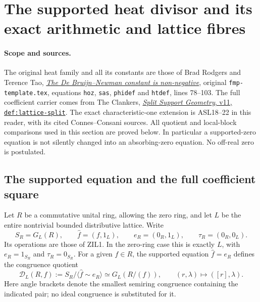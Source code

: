 \section{The supported heat divisor and its exact arithmetic and lattice fibres}
\label{sec:full-lattice-heat-divisor}

\paragraph{Scope and sources.}
The original heat family and all its constants are those of Brad Rodgers
and Terence Tao, \href{https://arxiv.org/abs/1801.05914v5}{\emph{The
De Bruijn--Newman constant is non-negative}}, original
\nolinkurl{fmp-template.tex}, equations \texttt{hoz}, \texttt{sas},
\texttt{phidef} and \texttt{htdef}, lines 78--103.
The full coefficient carrier comes from The Clankers,
\href{https://github.com/KokunoYumeto/zeta-function-research-reader/blob/a2851f9eb352e7e4376bc629de86fa4ed9c1c434/workbenches/splitzero-tandem/foundations/split-support-geometry-v11/split_support_geometry_arithmetic_curve_v11.tex#L1226}{\emph{Split
Support Geometry}, v11, \texttt{def:lattice-split}}.
The exact characteristic-one extension is ASL18--22 in this reader,
with its cited Connes--Consani sources. All quotient and local-block
comparisons used in this section are proved below. In particular a
supported-zero equation is not silently changed into an absorbing-zero
equation. No off-real zero is postulated.

\subsection{The supported equation and the full coefficient square}

Let $R$ be a commutative unital ring, allowing the zero ring, and let
$L$ be the entire nontrivial bounded distributive lattice. Write
\begin{equation}\tag{HZD1}
 S_R=G_L(R),\qquad \widehat f=(f,1_L),\qquad
 e_R=(0_R,1_L),\qquad \tau_R=(0_R,0_L).
\end{equation}
Its operations are those of ZIL1. In the zero-ring case this is
exactly $L$, with $e_R=1_{S_R}$ and $\tau_R=0_{S_R}$.
For a given $f\in R$, the supported equation $\widehat f=e_R$
defines the congruence quotient
\begin{equation}\tag{HZD2}
 \mathcal D_L(R,f):=S_R/\langle\widehat f\sim e_R\rangle
       \simeq G_L(R/(f)),\qquad
 (r,\lambda)\longmapsto([r],\lambda).
\end{equation}
Here angle brackets denote the smallest semiring congruence containing
the indicated pair; no ideal congruence is substituted for it.


